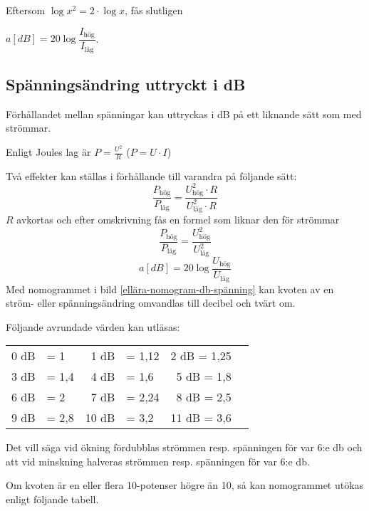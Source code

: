 Eftersom \(\log x^2 = 2 \cdot \log x\), fås slutligen

\(a[dB] = 20\log \dfrac{I_\text{hög}}{I_\text{låg}}\).

\subsection{Spänningsändring uttryckt i dB}

Förhållandet mellan spänningar kan uttryckas i dB på ett liknande sätt som med
strömmar.

Enligt Joules lag är \(P = \frac{U^2}{R}\) (\(P = U \cdot I\))

Två effekter kan ställas i förhållande till varandra på följande sätt:
\[\dfrac{P_\text{hög}}{P_\text{låg}}=\dfrac{U_\text{hög}^2 \cdot R}{U_\text{låg}^2 \cdot R}\]
\(R\) avkortas och efter omskrivning fås en formel som liknar den för strömmar
\[\dfrac{P_\text{hög}}{P_\text{låg}} = \dfrac{U_\text{hög}^2}{U_\text{låg}^2}\]
\[a[dB] = 20\log \dfrac{U_\text{hög}}{U_\text{låg}}\]
Med nomogrammet i bild \ref{ellära-nomogram-db-spänning} kan kvoten av en
ström- eller spänningsändring omvandlas till decibel och tvärt om.


Följande avrundade värden kan utläsas:

\begin{center}
\begin{tabular}{rlrlrl}
0 dB & = 1   &  1 dB & = 1,12 &  2 dB = 1,25 \\
3 dB & = 1,4 &  4 dB & = 1,6  &  5 dB = 1,8 \\
6 dB & = 2   &  7 dB & = 2,24 &  8 dB = 2,5 \\
9 dB & = 2,8 & 10 dB & = 3,2  & 11 dB = 3,6
\end{tabular}
\end{center}

Det vill säga vid ökning fördubblas strömmen resp. spänningen för var 6:e
\si{\decibel} och att vid minskning halveras strömmen resp. spänningen för var
6:e \si{\decibel}.

Om kvoten är en eller flera 10-potenser högre än 10, så kan nomogrammet utökas
enligt följande tabell.

